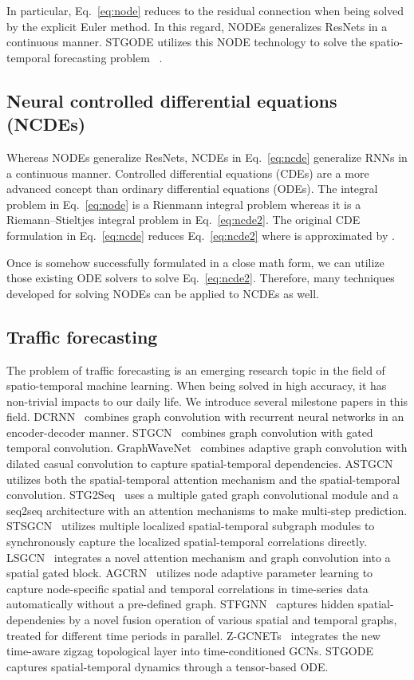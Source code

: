 \documentclass[letterpaper]{article} \usepackage{aaai22}  \usepackage{times}  \usepackage{helvet}  \usepackage{courier}  \usepackage[hyphens]{url}  \usepackage{graphicx} \urlstyle{rm} \def\UrlFont{\rm}  \usepackage{natbib}  \usepackage{caption} \DeclareCaptionStyle{ruled}{labelfont=normalfont,labelsep=colon,strut=off} \frenchspacing  \setlength{\pdfpagewidth}{8.5in}  \setlength{\pdfpageheight}{11in}  \usepackage{stfloats}
\begin{document}
In particular, Eq.~\eqref{eq:node} reduces to the residual connection when being solved by the explicit Euler method. In this regard, NODEs generalizes ResNets in a continuous manner. STGODE utilizes this NODE technology to solve the spatio-temporal forecasting problem ~\cite{fang2021STODE}.

\subsection{Neural controlled differential equations (NCDEs)}
Whereas NODEs generalize ResNets, NCDEs in Eq.~\eqref{eq:ncde} generalize RNNs in a continuous manner. Controlled differential equations (CDEs) are a more advanced concept than ordinary differential equations (ODEs). The integral problem in Eq.~\eqref{eq:node} is a Rienmann integral problem whereas it is a Riemann--Stieltjes integral problem in Eq.~\eqref{eq:ncde2}. The original CDE formulation in Eq.~\eqref{eq:ncde} reduces Eq.~\eqref{eq:ncde2} where  is approximated by .

Once  is somehow successfully formulated in a close math form, we can utilize those existing ODE solvers to solve Eq.~\eqref{eq:ncde2}. Therefore, many techniques developed for solving NODEs can be applied to NCDEs as well.

\subsection{Traffic forecasting}
The problem of traffic forecasting is an emerging research topic in the field of spatio-temporal machine learning. When being solved in high accuracy, it has non-trivial impacts to our daily life. We introduce several milestone papers in this field. DCRNN~\cite{li2018dcrnn_traffic} combines graph convolution with recurrent neural networks in an encoder-decoder manner. STGCN~\cite{bing2018stgcn} combines graph convolution with gated temporal convolution. GraphWaveNet~\cite{wu2019graphwavenet} combines adaptive graph convolution with dilated casual convolution to capture spatial-temporal dependencies. ASTGCN~\cite{guo2019astgcn} utilizes both the spatial-temporal attention mechanism and the spatial-temporal convolution. STG2Seq~\cite{bai2019STG2Seq} uses a multiple gated graph convolutional module and a seq2seq architecture with an attention mechanisms to make multi-step prediction. STSGCN~\cite{song2020stsgcn} utilizes multiple localized spatial-temporal subgraph modules to synchronously capture the localized spatial-temporal correlations directly. LSGCN~\cite{huang2020lsgcn} integrates a novel attention mechanism and graph convolution into a spatial gated block. AGCRN~\cite{NEURIPS2020_ce1aad92} utilizes node adaptive parameter learning to capture node-specific spatial and temporal correlations in time-series data automatically without a pre-defined graph. STFGNN~\cite{li2021stfgnn} captures hidden spatial-dependenies by a novel fusion operation of various spatial and temporal graphs, treated for different time periods in parallel. Z-GCNETs~\cite{chen2021ZGCNET} integrates the new time-aware zigzag topological layer into time-conditioned GCNs. STGODE~\cite{fang2021STODE} captures spatial-temporal dynamics through a tensor-based ODE.
\end{document}
